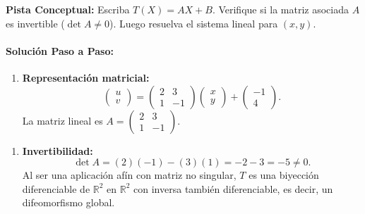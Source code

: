 \documentclass[11pt,a4paper]{article}
\begin{document}
\begin{tcolorbox}[colback=yellow!4,colframe=accentamber!70,arc=1mm,boxrule=0.5pt,left=3mm,right=3mm,top=1.5mm,bottom=1.5mm]
\textbf{Pista Conceptual:} Escriba $T(X) = AX + B$. Verifique si la matriz asociada $A$ es invertible ($\det A \neq 0$). Luego resuelva el sistema lineal para $(x,y)$.
\end{tcolorbox}

\paragraph{Solución Paso a Paso:}\par
\begin{enumerate}[label=\textbf{\arabic*.}]
\item \textbf{Representación matricial:}
\begin{equation*}
\begin{pmatrix} u \\ v \end{pmatrix} = \begin{pmatrix} 2 & 3 \\ 1 & -1 \end{pmatrix} \begin{pmatrix} x \\ y \end{pmatrix} + \begin{pmatrix} -1 \\ 4 \end{pmatrix}.
\end{equation*}
La matriz lineal es $A = \begin{pmatrix} 2 & 3 \\ 1 & -1 \end{pmatrix}$.
\end{enumerate}

\begin{enumerate}[label=\textbf{\arabic*.}]
\item \textbf{Invertibilidad:}
\begin{equation*}
\det A = (2)(-1) - (3)(1) = -2 - 3 = -5 \neq 0.
\end{equation*}
Al ser una aplicación afín con matriz no singular, $T$ es una biyección diferenciable de $\mathbb{R}^2$ en $\mathbb{R}^2$ con inversa también diferenciable, es decir, un difeomorfismo global.
\end{enumerate}
\end{document}
